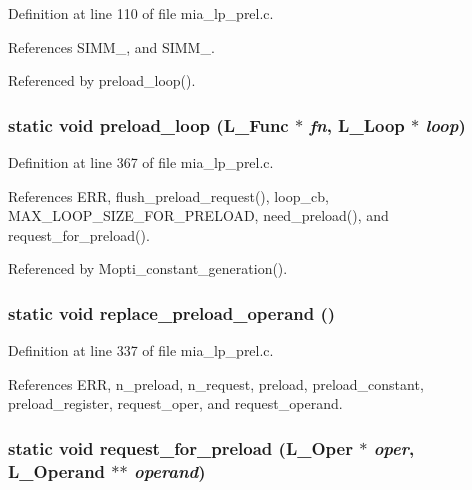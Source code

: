 Definition at line 110 of file mia\_\-lp\_\-prel.c.

References SIMM\_, and SIMM\_.

Referenced by preload\_\-loop().
\subsubsection{\setlength{\rightskip}{0pt plus 5cm}static void preload\_\-loop (L\_\-Func $\ast$ {\em fn}, L\_\-Loop $\ast$ {\em loop})\hspace{0.3cm}{\tt  [static]}}\label{mia__lp__prel_8c_59ae35d80101b898bda2b30736db1065}




Definition at line 367 of file mia\_\-lp\_\-prel.c.

References ERR, flush\_\-preload\_\-request(), loop\_\-cb, MAX\_\-LOOP\_\-SIZE\_\-FOR\_\-PRELOAD, need\_\-preload(), and request\_\-for\_\-preload().

Referenced by Mopti\_\-constant\_\-generation().
\subsubsection{\setlength{\rightskip}{0pt plus 5cm}static void replace\_\-preload\_\-operand ()\hspace{0.3cm}{\tt  [static]}}\label{mia__lp__prel_8c_c00fb0eb1175b6e432c0db7b3f466ca2}




Definition at line 337 of file mia\_\-lp\_\-prel.c.

References ERR, n\_\-preload, n\_\-request, preload, preload\_\-constant, preload\_\-register, request\_\-oper, and request\_\-operand.
\subsubsection{\setlength{\rightskip}{0pt plus 5cm}static void request\_\-for\_\-preload (L\_\-Oper $\ast$ {\em oper}, L\_\-Operand $\ast$$\ast$ {\em operand})\hspace{0.3cm}{\tt  [static]}}\label{mia__lp__prel_8c_253f57304a67b2453b2ec4bb061666c7}




